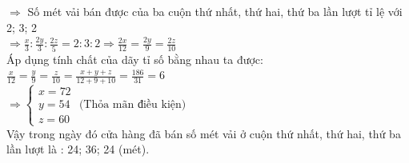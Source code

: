 \begin{bt}
{\begin{enumerate}
            $\Rightarrow$ Số mét vải bán được của ba cuộn thứ nhất, thứ hai, thứ ba lần lượt tỉ lệ với 2; 3; 2\\[5pt]
            $\Rightarrow \frac{x}{3}: \frac{2 y}{3}: \frac{2 z}{5}=2: 3: 2 \Rightarrow \frac{2 x}{12}=\frac{2 y}{9}=\frac{2 z}{10}$\\[5pt]
            Áp dụng tính chất của dãy tỉ số bằng nhau ta được:\\[5pt] $\frac{x}{12}=\frac{y}{9}=\frac{z}{10}=\frac{x+y+z}{12+9+10}=\frac{186}{31}=6$\\[5pt]
            $\Rightarrow\left\{\begin{array}{l}
            x=72 \\
            y=54 \\
            z=60
            \end{array}\right. \text { (Thỏa mãn điều kiện) }$\\[5pt]
            Vậy trong ngày đó cửa hàng đã bán số mét vải ở cuộn thứ nhất, thứ hai, thứ ba lần lượt là : 24; 36; 24 (mét).
        \end{enumerate}
    } 
\end{bt}

